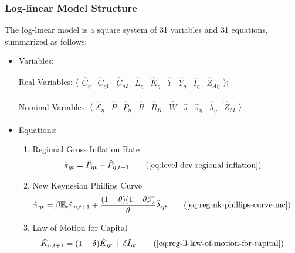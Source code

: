 \documentclass[../thesis.tex]{subfiles}
\begin{document}
\subsubsection{Log-linear Model Structure}

The log-linear model is a square system of 31 variables and 31 equations, summarized as follows:

{\singlespacing

\begin{itemize}
	
	\item Variables:
	
	Real Variables: $\langle \begin{smallmatrix} \hat{C}_{\eta} & \hat{C}_{\eta 1} & \hat{C}_{\eta 2} & \hat{L}_{\eta} & \hat{K}_{\eta} & \hat{Y} & \hat{Y}_{\eta} & \hat{I}_{\eta} & \hat{Z}_{A\eta} \end{smallmatrix} \rangle$;
	
	Nominal Variables: $\langle \begin{smallmatrix} \hat{\mathscr{E}}_{\eta} & \hat{P} & \hat{P}_{\eta} & \hat{R} & \hat{R}_{K} & \hat{W} & \hat{\pi} & \hat{\pi}_{\eta} & \hat{\lambda}_{\eta} & \hat{Z}_M \end{smallmatrix} \rangle$.
	
	\item Equations:
	
	\begin{enumerate}
		
		\item Regional Gross Inflation Rate
		\begin{align}
			\hat{\pi}_{\eta t} &= \hat{P}_{\eta t} - \hat{P}_{\eta, t-1} \tag{\ref{eq:level-dev-regional-inflation}}
		\end{align}
		
		\item New Keynesian Phillips Curve
		\begin{align}
			\hat{\pi}_{\eta t} &= \beta \E \hat{\pi}_{\eta, t+1} + \frac{(1-\theta) (1- \theta \beta)}{\theta} \hat{\lambda}_{\eta t} \tag{\ref{eq:reg-nk-phillips-curve-mc}}
		\end{align}
		
		\item Law of Motion for Capital
		\begin{alignat}{2}
			\hat{K}_{\eta, t+1} &= (1-\delta) \hat{K}_{\eta t} + \delta \hat{I}_{\eta t} \tag{\ref{eq:reg-ll-law-of-motion-for-capital}}
		\end{alignat}
		

\end{enumerate}
\end{itemize}}
\end{document}

